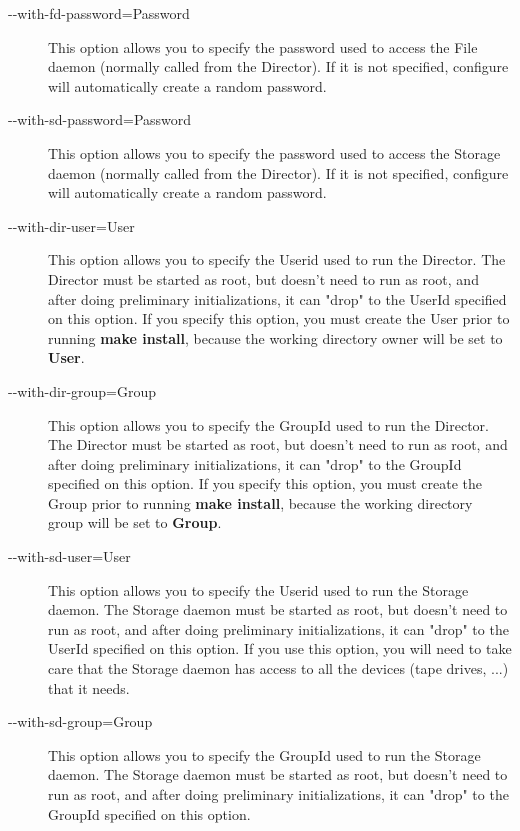 \begin{description}
\item [ {-}{-}with-fd-password=\lt{}Password\gt{} ]
   This option allows you to specify the password used to  access the File daemon
   (normally called from the Director).  If it is not specified, configure will
   automatically create a random  password.  

\item [ {-}{-}with-sd-password=\lt{}Password\gt{} ]
   This option allows you to specify the password used to access the Storage daemon
   (normally called from the Director).  If it is not specified, configure will
   automatically create a random  password.  

\item [ {-}{-}with-dir-user=\lt{}User\gt{} ]
   This option allows you to specify the Userid used to run the Director.  The
   Director must be started as root, but doesn't need to run as root, and
   after doing preliminary initializations, it can "drop" to the UserId
   specified on this option.  
   If you specify this option, you must
   create the User prior to running {\bf make install}, because the
   working directory owner will be set to {\bf User}.
                       
\item [ {-}{-}with-dir-group=\lt{}Group\gt{} ]
   This option allows you to specify the GroupId used to  run the Director. The
   Director must be started as root, but  doesn't need to run as root, and  after
   doing preliminary initializations, it can "drop"  to the GroupId specified
   on this option. 
   If you specify this option, you must
   create the Group prior to running {\bf make install}, because the
   working directory group will be set to {\bf Group}.

\item [ {-}{-}with-sd-user=\lt{}User\gt{} ]
   This option allows you to specify the Userid used to  run the Storage daemon.
   The Storage daemon must be started as root, but  doesn't need to run as root,
   and  after doing preliminary initializations, it can "drop"  to the UserId
   specified on this option. If you use this option,  you will need to take care
   that the Storage daemon has access  to all the devices (tape drives, ...) that
   it needs. 

\item [ {-}{-}with-sd-group=\lt{}Group\gt{} ]
   This option allows you to specify the GroupId used to  run the Storage daemon.
   The Storage daemon must be started as root, but  doesn't need to run as root,
   and  after doing preliminary initializations, it can "drop"  to the GroupId
   specified on this option. 


\end{description}
